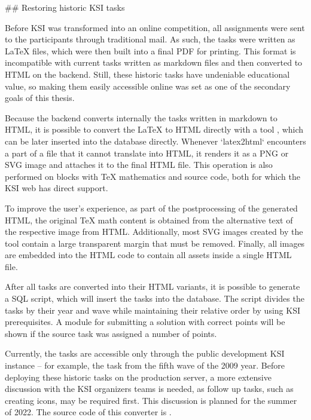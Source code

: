 \documentclass[
  digital, %
  oneside, %
  lof,     %
  nolot,     %
]{fithesis4}
\begin{document}
{## Restoring historic \acrshort{KSI} tasks

Before \acrshort{KSI} was transformed into an online competition, all assignments were sent to the participants through traditional mail. As such, the tasks were written as \LaTeX{} files, which were then built into a final \acrshort{PDF} for printing. This format is incompatible with current tasks written as markdown files and then converted to HTML on the backend. Still, these historic tasks have undeniable educational value, so making them easily accessible online	was set as one of the secondary goals of this thesis.

Because the backend converts internally the tasks written in markdown to HTML, it is possible to convert the \LaTeX{} to HTML directly with a tool , which can be later inserted into the database directly. Whenever `latex2html` encounters a part of a file that it cannot translate into HTML, it renders it as a \acrshort{PNG} or \acrshort{SVG} image and attaches it to the final HTML file. This operation is also performed on blocks with TeX mathematics and source code, both for which the \acrshort{KSI} web has direct support.

To improve the user's experience, as part of the postprocessing of the generated HTML, the original TeX math content is obtained from the alternative text of the respective image from HTML. Additionally, most \acrshort{SVG} images created by the tool contain a large transparent margin that must be removed. Finally, all images are embedded into the HTML code to contain all assets inside a single HTML file.

After all tasks are converted into their HTML variants, it is possible to generate a SQL script, which will insert the tasks into the database. The script divides the tasks by their year and wave while maintaining their relative order by using \acrshort{KSI} prerequisites. A module for submitting a solution with correct points will be shown if the source task was assigned a number of points.

Currently, the tasks are accessible only through the public development \acrshort{KSI} instance -- for example, the task  from the fifth wave of the 2009 year. Before deploying these historic tasks on the production server, a more extensive discussion with the \acrshort{KSI} organizers teams is needed, as follow up tasks, such as creating icons, may be required first. This discussion is planned for the summer of 2022. The source code of this converter is .

}
\end{document}
